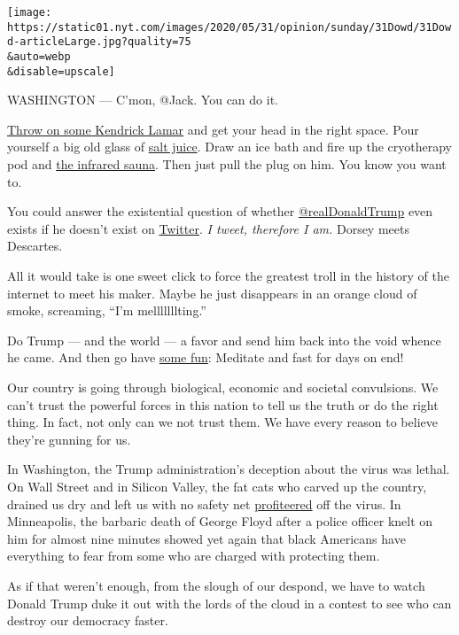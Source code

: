 \texttt{[image: https://static01.nyt.com/images/2020/05/31/opinion/sunday/31Dowd/31Dowd-articleLarge.jpg?quality=75\\\&auto=webp\\\&disable=upscale]}

WASHINGTON --- C'mon, @Jack. You can do it.

\href{https://twitter.com/jack/status/630260438647898112?lang=en}{Throw
on some Kendrick Lamar} and get your head in the right space. Pour
yourself a big old glass of
\href{https://www.businessinsider.com/why-jack-dorsey-drinks-salt-juice-every-morning-2019-5}{salt
juice}. Draw an ice bath and fire up the cryotherapy pod and
\href{https://www.nytimes.com/2019/05/02/fashion/jack-dorsey-influencer.html}{the
infrared sauna}. Then just pull the plug on him. You know you want to.

You could answer the existential question of whether
\href{https://www.nytimes.com/2020/06/23/technology/trump-twitter-label-seattle.html}{@realDonaldTrump}
even exists if he doesn't exist on
\href{https://www.nytimes.com/2020/06/23/technology/trump-twitter-label-seattle.html}{Twitter}.
\emph{I tweet, therefore I am.} Dorsey meets Descartes.

All it would take is one sweet click to force the greatest troll in the
history of the internet to meet his maker. Maybe he just disappears in
an orange cloud of smoke, screaming, ``I'm melllllllting.''

Do Trump --- and the world --- a favor and send him back into the void
whence he came. And then go have
\href{https://twitter.com/jack/status/1071575088695140353?s=20}{some
fun}: Meditate and fast for days on end!

Our country is going through biological, economic and societal
convulsions. We can't trust the powerful forces in this nation to tell
us the truth or do the right thing. In fact, not only can we not trust
them. We have every reason to believe they're gunning for us.

In Washington, the Trump administration's deception about the virus was
lethal. On Wall Street and in Silicon Valley, the fat cats who carved up
the country, drained us dry and left us with no safety net
\href{https://www.cnn.com/2020/04/28/perspectives/inequality-coronavirus-billionaires/index.html}{profiteered}
off the virus. In Minneapolis, the barbaric death of George Floyd after
a police officer knelt on him for almost nine minutes showed yet again
that black Americans have everything to fear from some who are charged
with protecting them.

As if that weren't enough, from the slough of our despond, we have to
watch Donald Trump duke it out with the lords of the cloud in a contest
to see who can destroy our democracy faster.

